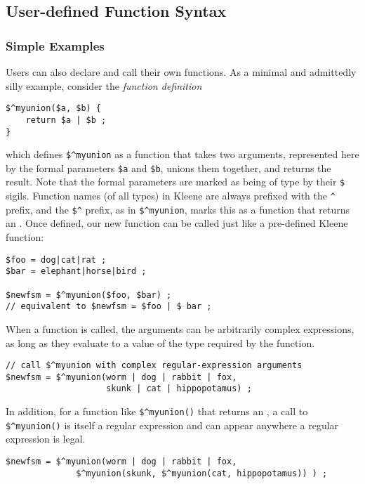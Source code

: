 \subsection{User-defined Function Syntax}

\subsubsection{Simple Examples}

Users can also declare and call their own functions.  As a minimal and admittedly silly example, consider the
\emph{function definition}

\begin{Verbatim}
$^myunion($a, $b) {
    return $a | $b ;
}
\end{Verbatim}

\noindent
which defines \verb!$^myunion! as a function that takes two \fsm{} arguments, represented here by the formal
parameters \verb!$a! and \verb!$b!, unions them together, and returns the \fsm{} result.  Note that the formal
parameters are marked as being of type \fsm{} by their \verb!$! sigils.  Function names (of all types) 
in Kleene are always
prefixed with the \verb!^! prefix, and the \verb!$^! prefix, as in \verb!$^myunion!, marks this as a function
that
returns an \fsm{}.  Once defined, our new function can be called just like a pre-defined Kleene function:

\begin{Verbatim}
$foo = dog|cat|rat ;
$bar = elephant|horse|bird ;

$newfsm = $^myunion($foo, $bar) ;
// equivalent to $newfsm = $foo | $ bar ;
\end{Verbatim}

\noindent
When a function is called, the arguments can be arbitrarily complex expressions, as long as they evaluate to a
value of the type required by the function.

\begin{Verbatim}
// call $^myunion with complex regular-expression arguments
$newfsm = $^myunion(worm | dog | rabbit | fox, 
                    skunk | cat | hippopotamus) ;
\end{Verbatim}

\noindent
In addition, for a function like \verb!$^myunion()! that returns an \fsm{}, a call to \verb!$^myunion()! is
itself a regular expression and can appear anywhere a regular expression is legal.

\begin{Verbatim}
$newfsm = $^myunion(worm | dog | rabbit | fox, 
              $^myunion(skunk, $^myunion(cat, hippopotamus)) ) ;
\end{Verbatim}


